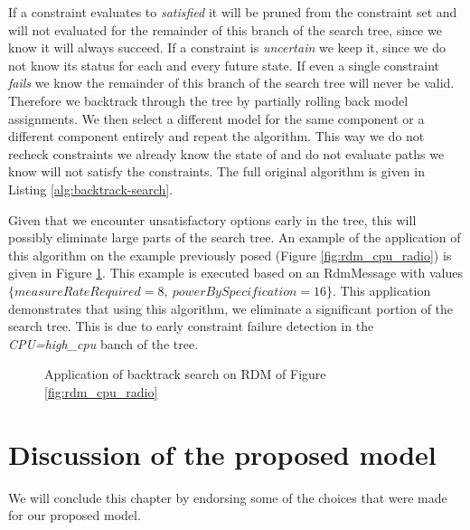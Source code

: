 If a constraint evaluates to \emph{satisfied} it will be pruned from the constraint set and will not evaluated for the remainder of this branch of the search tree, since we know it will always succeed. If a constraint is \emph{uncertain} we keep it, since we do not know its status for each and every future state. If even a single constraint \emph{fails} we know the remainder of this branch of the search tree will never be valid. Therefore we backtrack through the tree by partially rolling back model assignments. We then select a different model for the same component or a different component entirely and repeat the algorithm. This way we do not recheck constraints we already know the state of and do not evaluate paths we know will not satisfy the constraints. The full original algorithm is given in Listing \ref{alg:backtrack-search}. 

Given that we encounter unsatisfactory options early in the tree, this will possibly eliminate large parts of the search tree. An example of the application of this algorithm on the example previously posed (Figure \ref{fig:rdm_cpu_radio}) is given in Figure \ref{fig:search_cpu_radio}. This example is executed based on an RdmMessage with values $\{measureRateRequired=8,\ powerBySpecification=16\}$. This application demonstrates that using this algorithm, we eliminate a significant portion of the search tree. This is due to early constraint failure detection in the \emph{CPU=high\_cpu} banch of the tree.



\begin{figure}

\caption{Application of backtrack search on RDM of Figure \ref{fig:rdm_cpu_radio}}
\label{fig:search_cpu_radio}
\end{figure}


\section{Discussion of the proposed model}
We will conclude this chapter by endorsing some of the choices that were made for our proposed model. 
